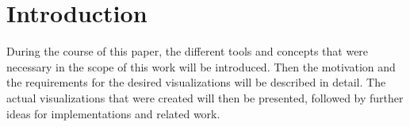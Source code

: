 \section{Introduction}

During the course of this paper, the different tools and concepts that were necessary in the scope of this work will be introduced. Then the motivation and the requirements for the desired visualizations will be described in detail. The actual visualizations that were created will then be presented, followed by further ideas for implementations and related work.